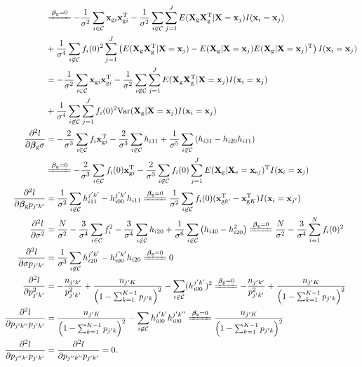 \documentclass[10pt,a4paper]{article}
\def\bbetag{\bm{\beta}_{\text{g}}}
\def\bx{\mathbf{x}}
\def\bX{\mathbf{X}}
\def\bxgi{\mathbf{x}_{\text{g}i}}
\def\bxgkk{\mathbf{x}_{\text{g}k'}}
\def\bxgK{\mathbf{x}_{\text{g}K}}
\def\bxej{\mathbf{x}_{\text{e}j}}
\def\bXg{\mathbf{X}_{\text{g}}}
\def\bXe{\mathbf{X}_{\text{e}}}
\begin{document}
\begin{align*}
& \xlongequal{\bbetag = 0} -\frac{1}{\sigma^2}\sum_{i \in \mathcal{C}} \bxgi \bxgi^{\text{T}} - \frac{1}{\sigma^2} \sum_{i \not \in \mathcal{C}} \sum_{j=1}^J E(\bXg \bXg^{\text{T}}|\bX = \bx_j)I(\bx_i=\bx_j) 
\\ &+ \frac{1}{\sigma^4} \sum_{i \not \in \mathcal{C}} f_i(0)^2 \sum_{j=1}^J \left( E(\bXg \bXg^{\text{T}}|\bX = \bx_j) - E(\bXg|\bX=\bx_j)E(\bXg|\bX=\bx_j)^{\text{T}} \right)I(\bx_i=\bx_j)  \\
& = -\frac{1}{\sigma^2}\sum_{i \in \mathcal{C}} \bxgi \bxgi^{\text{T}} - \frac{1}{\sigma^2} \sum_{i \not \in \mathcal{C}} \sum_{j=1}^J E(\bXg \bXg^{\text{T}}|\bX = \bx_j)I(\bx_i=\bx_j) 
\\ & + \frac{1}{\sigma^4} \sum_{i \not \in \mathcal{C}} \sum_{j=1}^J  f_i(0)^2 \text{Var}(\bXg|\bX = \bx_j) I(\bx_i=\bx_j) 
\\
\frac{\partial^2 l}{\partial \bbetag \sigma}
&= -\frac{2}{\sigma^3}\sum_{i \in \mathcal{C}} f_i \bxgi^{\text{T}} - \frac{2}{\sigma^3} \sum_{i \not \in \mathcal{C}} h_{i11} +  \frac{1}{\sigma^5} \sum_{i \not \in \mathcal{C}} \left( h_{i31} - h_{i20} h_{i11} \right) \\
& \xlongequal{\bbetag = 0} -\frac{2}{\sigma^3}\sum_{i \in \mathcal{C}} f_i(0) \bxgi^{\text{T}} - \frac{2}{\sigma^3} \sum_{i \not \in \mathcal{C}} f_i(0) \sum_{j=1}^J E(\bXg|\bXe = \bxej)^{\text{T}} I(\bx_i = \bx_j) 
\\
\frac{\partial^2 l}{\partial \bbetag p_{j'k'}} 
&= \frac{1}{\sigma^2} \sum_{i \not \in \mathcal{C}} h_{i11}^{j'k'} - h_{i00}^{j'k'} h_{i11}  \xlongequal{\bbetag = 0} \frac{1}{\sigma^2} \sum_{i \not \in \mathcal{C}} f_i(0)(\bxgkk^{\text{T}} - \bxgK^{\text{T}})I(\bx_i = \bx_{j'})\\
\frac{\partial^2 l}{\partial \sigma^2}
&= \frac{N}{\sigma^2} - \frac{3}{\sigma^4} \sum_{i \in \mathcal{C}}f_i^2 - \frac{3}{\sigma^4} \sum_{i \not \in \mathcal{C}} h_{i20} + \frac{1}{\sigma^6}\sum_{i \not \in \mathcal{C}} \left( h_{i40} - h_{i20}^2  \right)  \xlongequal{\bbetag = 0} \frac{N}{\sigma^2} - \frac{3}{\sigma^4} \sum_{i =1}^N f_i(0)^2  
\\
\frac{\partial^2 l}{\partial \sigma p_{j'k'}} 
&= \frac{1}{\sigma^3} \sum_{i \not \in \mathcal{C}} h_{i20}^{j'k'} - h_{i00}^{j'k'} h_{i20}  \xlongequal{\bbetag = 0}  0 \\
\frac{\partial^2 l}{\partial p_{j'k'}^2} & = 
- \frac{n_{j'k'}}{p_{j'k'}^2} + \frac{n_{j' K}}{\left(1- \sum_{k=1}^{K-1}p_{j'k}\right)^2}  - \sum_{i \not \in \mathcal{C}} (h_{i00}^{j'k'})^2  \xlongequal{\bbetag = 0} - \frac{n_{j'k'}}{p_{j'k'}^2} + \frac{n_{j' K}}{\left(1- \sum_{k=1}^{K-1}p_{j'k}\right)^2} \\
\frac{\partial^2 l}{\partial p_{j'k''} p_{j'k'}} & = 
 \frac{n_{j' K}}{\left(1- \sum_{k=1}^{K-1}p_{j'k}\right)^2}  - \sum_{i \not \in \mathcal{C}} h_{i00}^{j'k'} h_{i00}^{j'k''}  \xlongequal{\bbetag = 0} \frac{n_{j' K}}{\left(1- \sum_{k=1}^{K-1}p_{j'k}\right)^2} \\
\frac{\partial^2 l}{\partial p_{j''k'} p_{j'k'}} & = \frac{\partial^2 l}{\partial p_{j''k''} p_{j'k'}} =  0.
\end{align*}
\end{document}
